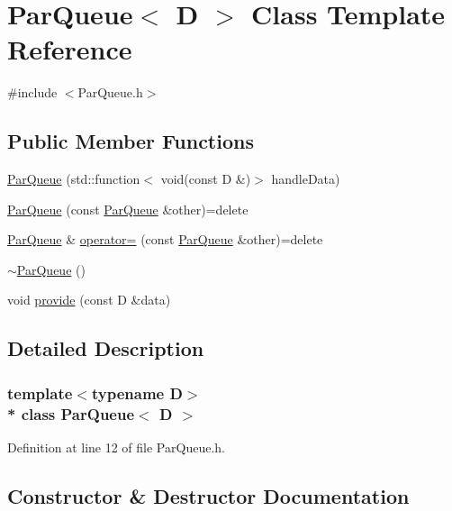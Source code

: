 \hypertarget{class_par_queue}{}\section{Par\+Queue$<$ D $>$ Class Template Reference}
\label{class_par_queue}


{\ttfamily \#include $<$Par\+Queue.\+h$>$}

\subsection*{Public Member Functions}
\begin{DoxyCompactItemize}
\item 
\hyperlink{class_par_queue_a73a919e4b58f1220a6f3a52af625b616}{Par\+Queue} (std\+::function$<$ void(const D \&)$>$ handle\+Data)
\item 
\hyperlink{class_par_queue_a4ea9ecbf02398dbf4862f07bf33b8504}{Par\+Queue} (const \hyperlink{class_par_queue}{Par\+Queue} \&other)=delete
\item 
\hyperlink{class_par_queue}{Par\+Queue} \& \hyperlink{class_par_queue_aedef197ecfe9a5625d8501b25b262504}{operator=} (const \hyperlink{class_par_queue}{Par\+Queue} \&other)=delete
\item 
\hyperlink{class_par_queue_a737d7f14e46d3144b3a9a51499e3079d}{$\sim$\+Par\+Queue} ()
\item 
void \hyperlink{class_par_queue_ae91d6ba584f537b85a8f1024d72128b5}{provide} (const D \&data)
\end{DoxyCompactItemize}


\subsection{Detailed Description}
\subsubsection*{template$<$typename D$>$\\*
class Par\+Queue$<$ D $>$}



Definition at line 12 of file Par\+Queue.\+h.



\subsection{Constructor \& Destructor Documentation}
